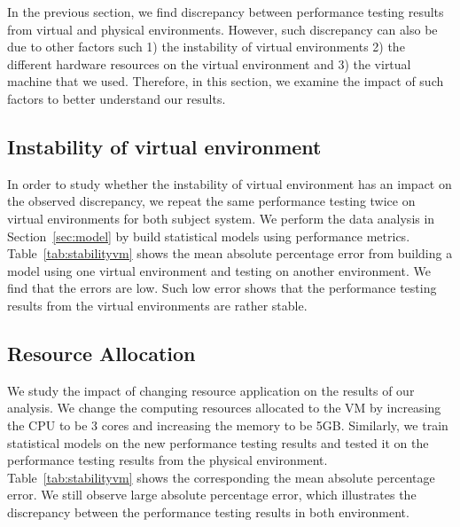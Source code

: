 In the previous section, we find discrepancy between performance testing results from virtual and physical environments. However, such discrepancy can also be due to other factors such 1) the instability of virtual environments 2) the different hardware resources on the virtual environment and 3) the virtual machine that we used. Therefore, in this section, we examine the impact of such factors to better understand our results. 


\subsection{Instability of virtual environment}

In order to study whether the instability of virtual environment has an impact on the observed discrepancy, we repeat the same performance testing twice on virtual environments for both subject system. We perform the data analysis in Section~\ref{sec:model} by build statistical models using performance metrics. Table~\ref{tab:stabilityvm} shows the mean absolute percentage error from building a model using one virtual environment and testing on another environment. We find that the errors are low. Such low error shows that the performance testing results from the virtual environments are rather stable. 






\subsection{Resource Allocation}
We study the impact of changing resource application on the results of our analysis. We change the computing resources allocated to the VM by increasing the CPU to be 3 cores and increasing the memory to be 5GB. Similarly, we train statistical models on the new performance testing results and tested it on the performance testing results from the physical environment. Table~\ref{tab:stabilityvm} shows the corresponding the mean absolute percentage error. We still observe large absolute percentage error, which illustrates the discrepancy between the performance testing results in both environment. 

